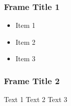\documentclass[handout]{beamer}
\begin{document}
\begin{frame}
\frametitle{Frame Title 1}

\begin{itemize}[<+->]
\item Item 1
\item Item 2
\item Item 3
\end{itemize}

\end{frame}

\begin{frame}
\frametitle{Frame Title 2}

Text 1 \pause Text 2 \pause Text 3

\end{frame}
\end{document}
